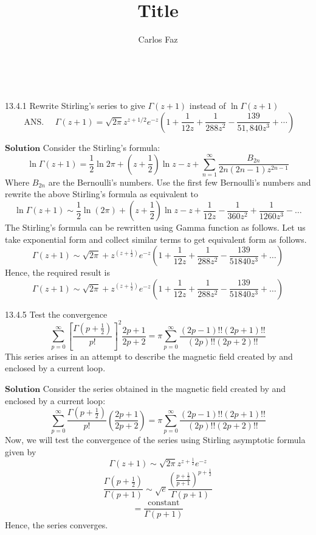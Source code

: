 \documentclass{article}
\title{Title}
\author{Carlos Faz}
\date{ \ }
\begin{document}
\maketitle

\begin{flushleft}


\begin{mybox}{13.4.1}
Rewrite Stirling's series to give $\Gamma(z+1)$ instead of $\ln \Gamma(z+1)$
$$
\text { ANS. } \quad \Gamma(z+1)=\sqrt{2 \pi} z^{z+1 / 2} e^{-z}\left(1+\frac{1}{12 z}+\frac{1}{288 z^{2}}-\frac{139}{51,840 z^{3}}+\cdots\right)
$$
\end{mybox}
$\boxed{\textbf{Solution}}$ Consider the Stirling's formula: 
$$\ln \Gamma(z+1)=\frac{1}{2} \ln 2 \pi+\left(z+\frac{1}{2}\right) \ln z-z+\sum_{n=1}^{\infty} \frac{B_{2 n}}{2 n(2 n-1) z^{2 n-1}}$$
Where $B_{2 n}$ are the Bernoulli's numbers. Use the first few Bernoulli's numbers and rewrite the above Stirling's formula as equivalent to
$$\ln \Gamma(z+1) \sim \frac{1}{2} \ln (2 \pi)+\left(z+\frac{1}{2}\right) \ln z-z+\frac{1}{12 z}-\frac{1}{360 z^{2}}+\frac{1}{1260 z^{3}}-\ldots$$
The Stirling's formula can be rewritten using Gamma function as follows.
Let us take exponential form and collect similar terms to get equivalent form as follows.
$$
\Gamma(z+1) \sim \sqrt{2 \pi}+z^{\left(z+\frac{1}{2}\right)} e^{-z}\left(1+\frac{1}{12 z}+\frac{1}{288 z^{2}}-\frac{139}{51840 z^{3}}+\ldots\right)
$$
Hence, the required result is $$\Gamma(z+1) \sim \sqrt{2 \pi}+z^{\left(z+\frac{1}{2}\right)} e^{-z}\left(1+\frac{1}{12 z}+\frac{1}{288 z^{2}}-\frac{139}{51840 z^{3}}+\ldots\right)$$


\begin{mybox}{13.4.5}
Test the convergence
$$
\sum_{p=0}^{\infty}\left[\frac{\Gamma\left(p+\frac{1}{2}\right)}{p !}\right]^{2} \frac{2 p+1}{2 p+2}=\pi \sum_{p=0}^{\infty} \frac{(2 p-1) ! !(2 p+1) ! !}{(2 p) ! !(2 p+2) ! !}
$$
This series arises in an attempt to describe the magnetic field created by and enclosed by a current loop.
\end{mybox}
$\boxed{\textbf{Solution}}$ Consider the series obtained in the magnetic field created by and enclosed by a current loop:
$$
\sum_{p=0}^{\infty} \frac{\Gamma\left(p+\frac{1}{2}\right)}{p !}\left(\frac{2 p+1}{2 p+2}\right)=\pi \sum_{p=0}^{\infty} \frac{(2 p-1) ! !(2 p+1) ! !}{(2 p) ! !(2 p+2) ! !}
$$
Now, we will test the convergence of the series using Stirling asymptotic formula given by
$$
\Gamma(z+1) \sim \sqrt{2 \pi} z^{z+\frac{1}{2}} e^{-z}
$$
$$
\frac{\Gamma\left(p+\frac{1}{2}\right)}{\Gamma(p+1)} \sim \sqrt{e} \frac{\left(\frac{p+\frac{1}{2}}{p+1}\right)^{p+\frac{1}{2}}}{\Gamma(p+1)}
$$
$$
=\frac{\text { constant }}{\Gamma(p+1)}
$$
Hence, the series converges.




\end{flushleft}
\end{document}
